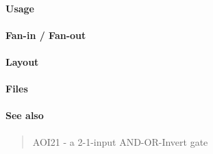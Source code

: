 \paragraph{Usage}

\paragraph{Fan-in / Fan-out}

\paragraph{Layout}

\paragraph{Files}

\paragraph{See also}
\begin{quote}
    AOI21 - a 2-1-input AND-OR-Invert gate
\end{quote}
